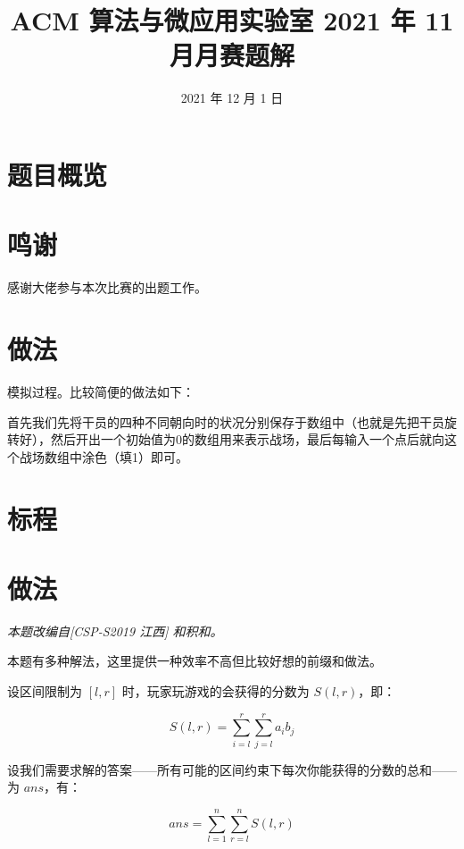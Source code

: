 \documentclass{../cpct/ctsol}
\title{ACM 算法与微应用实验室 2021 年 11 月月赛题解}
\date{2021 年 12 月 1 日}
\begin{document}
\maketitle
{}

\section*{题目概览}

\solutiontab

\section*{鸣谢}

感谢\href{https://github.com/Tiphereth-A}{\@Tifa}大佬参与本次比赛的出题工作。

\makesolution
\section*{做法}

模拟过程。比较简便的做法如下：

首先我们先将干员的四种不同朝向时的状况分别保存于数组中（也就是先把干员旋转好），然后开出一个初始值为0的数组用来表示战场，最后每输入一个点后就向这个战场数组中涂色（填1）即可。

\section*{标程}


\makesolution
\section*{做法}

\emph{本题改编自[CSP-S2019 江西] 和积和。}

本题有多种解法，这里提供一种效率不高但比较好想的前缀和做法。

设区间限制为 $[l,r]$ 时，玩家玩游戏的会获得的分数为 $S(l,r)$，即：

$$S(l,r) = \sum_{i=l}^r \sum_{j=l}^r a_i b_j$$

设我们需要求解的答案——所有可能的区间约束下每次你能获得的分数的总和——为 $ans$，有：

$$ans = \sum_{l=1}^n \sum_{r=l}^n S(l,r)$$
\end{document}
